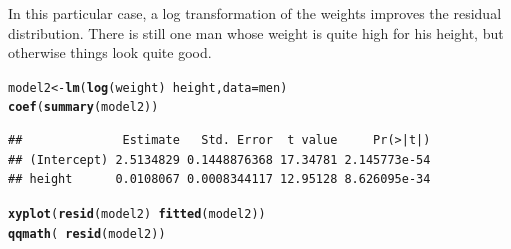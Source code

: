 \documentclass[twoside]{book}\usepackage[]{graphicx}\usepackage[]{xcolor}
\makeatletter
\newcommand{\hlopt}[1]{\textcolor[rgb]{0,0,0}{#1}}%
\newcommand{\hlstd}[1]{\textcolor[rgb]{0.345,0.345,0.345}{#1}}%
\newcommand{\hlkwb}[1]{\textcolor[rgb]{0.69,0.353,0.396}{#1}}%
\newcommand{\hlkwc}[1]{\textcolor[rgb]{0.333,0.667,0.333}{#1}}%
\newcommand{\hlkwd}[1]{\textcolor[rgb]{0.737,0.353,0.396}{\textbf{#1}}}%
\newenvironment{kframe}{%
 \def\at@end@of@kframe{}%
 \ifinner\ifhmode%
  \def\at@end@of@kframe{\end{minipage}}%
  \begin{minipage}{\columnwidth}%
 \fi\fi%
 \def\FrameCommand##1{\hskip\@totalleftmargin \hskip-\fboxsep
 \colorbox{shadecolor}{##1}\hskip-\fboxsep
     \hskip-\linewidth \hskip-\@totalleftmargin \hskip\columnwidth}%
 \MakeFramed {\advance\hsize-\width
   \@totalleftmargin\z@ \linewidth\hsize
   \@setminipage}}%
 {\par\unskip\endMakeFramed%
 \at@end@of@kframe}
\newenvironment{knitrout}{}{} %
\makeatother
\begin{document}
\begin{solution}
\begin{enumerate}
In this particular case, a log transformation of the weights improves the
residual distribution.  There is still one man whose weight is quite high for
his height, but otherwise things look quite good.
\begin{knitrout}
\color{fgcolor}\begin{kframe}
\begin{alltt}
\hlstd{model2} \hlkwb{<-} \hlkwd{lm}\hlstd{(} \hlkwd{log}\hlstd{(weight)} \hlopt{~} \hlstd{height,} \hlkwc{data}\hlstd{=men )}
\hlkwd{coef}\hlstd{(}\hlkwd{summary}\hlstd{(model2))}
\end{alltt}
\begin{verbatim}
##              Estimate   Std. Error  t value     Pr(>|t|)
## (Intercept) 2.5134829 0.1448876368 17.34781 2.145773e-54
## height      0.0108067 0.0008344117 12.95128 8.626095e-34
\end{verbatim}
\begin{alltt}
\hlkwd{xyplot}\hlstd{(} \hlkwd{resid}\hlstd{(model2)} \hlopt{~} \hlkwd{fitted}\hlstd{(model2) )}
\hlkwd{qqmath}\hlstd{(} \hlopt{~}\hlkwd{resid}\hlstd{(model2) )}
\end{alltt}
\end{kframe}


\end{knitrout}
\end{enumerate}
\end{solution}
\end{document}
